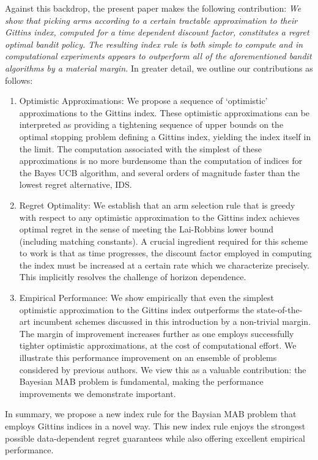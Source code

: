 Against this backdrop, the present paper makes the following contribution: {\em We show that picking arms according to a certain tractable approximation to their Gittins index, computed for a time dependent discount factor, constitutes a regret optimal bandit policy. The resulting index rule is both simple to compute and in computational experiments appears to outperform all of the aforementioned bandit algorithms by a material margin.} In greater detail, we outline our contributions as follows:

\begin{enumerate}

\item Optimistic Approximations: We propose a sequence of `optimistic' approximations to the Gittins index. These optimistic approximations can be interpreted as providing a tightening sequence of upper bounds on the optimal stopping problem defining a Gittins index, yielding the index itself in the limit. The computation associated with the simplest of these approximations is no more burdensome than the computation of indices for the Bayes UCB algorithm, and several orders of magnitude faster than the lowest regret alternative, IDS. 
\item Regret Optimality: We establish that an arm selection rule that is greedy with respect to any optimistic approximation to the Gittins index achieves optimal regret in the sense of meeting the Lai-Robbins lower bound (including matching constants). A crucial ingredient required for this scheme to work is that as time progresses, the discount factor employed in computing the index must be increased at a certain rate which we characterize precisely. This implicitly resolves the challenge of horizon dependence. 
\item Empirical Performance: We show empirically that even the simplest optimistic approximation to the Gittins index outperforms the state-of-the-art incumbent schemes discussed in this introduction by a non-trivial margin. The margin of improvement increases further as one employs successfully tighter optimistic approximations, at the cost of computational effort. We illustrate this performance improvement on an ensemble of problems considered by previous authors. We view this as a valuable contribution: the Bayesian MAB problem is fundamental, making the performance improvements we demonstrate important.  
\end{enumerate}

In summary, we propose a new index rule for the Baysian MAB problem that employs Gittins indices in a novel way. This new index rule enjoys the strongest possible data-dependent regret guarantees while also offering excellent empirical performance. 


